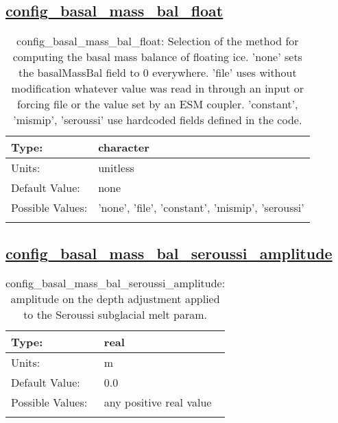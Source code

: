 \subsection[config\_basal\_mass\_bal\_float]{\hyperref[sec:nm_tab_thermal_solver]{config\_basal\_mass\_bal\_float}}
\label{subsec:nm_sec_config_basal_mass_bal_float}
\begin{center}
\begin{longtable}{| p{2.0in} || p{4.0in} |}
    \hline
    Type: & character \\
    \hline
    Units: & \si{unitless} \\
    \hline
    Default Value: & none \\
    \hline
    Possible Values: & 'none', 'file', 'constant', 'mismip', 'seroussi' \\
    \hline
    \caption{config\_basal\_mass\_bal\_float: Selection of the method for computing the basal mass balance of floating ice.  'none' sets the basalMassBal field to 0 everywhere.  'file' uses without modification whatever value was read in through an input or forcing file or the value set by an ESM coupler.  'constant', 'mismip', 'seroussi' use hardcoded fields defined in the code.}
\end{longtable}
\end{center}
\subsection[config\_basal\_mass\_bal\_seroussi\_amplitude]{\hyperref[sec:nm_tab_thermal_solver]{config\_basal\_mass\_bal\_seroussi\_amplitude}}
\label{subsec:nm_sec_config_basal_mass_bal_seroussi_amplitude}
\begin{center}
\begin{longtable}{| p{2.0in} || p{4.0in} |}
    \hline
    Type: & real \\
    \hline
    Units: & \si{m} \\
    \hline
    Default Value: & 0.0 \\
    \hline
    Possible Values: & any positive real value \\
    \hline
    \caption{config\_basal\_mass\_bal\_seroussi\_amplitude: amplitude on the depth adjustment applied to the Seroussi subglacial melt param.}
\end{longtable}
\end{center}
